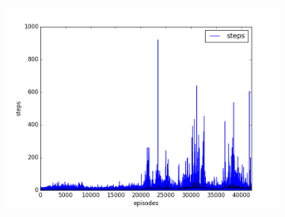 \begin{figure}[t]
  ~
  \begin{subfigure}[t]{\figscale\linewidth}
    \includegraphics[width=1.5\textwidth]
    {../results/maddpg_1vs2/steps.png}
    \label{fig:maddpg-1vs2-steps}
  \end{subfigure}


\end{figure}
